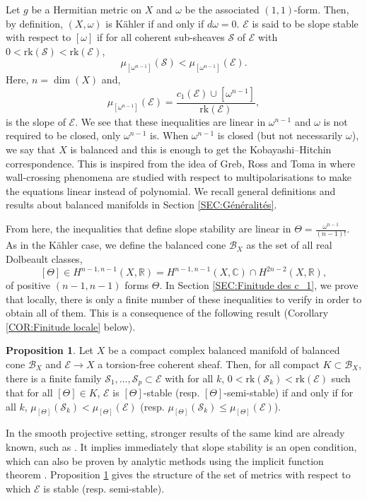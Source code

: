 \documentclass{article}
\theoremstyle{remark}
\theoremstyle{definition}
\newtheorem{propositionIntro}[theoremIntro]{Proposition}
\newcommand{\R}{\mathbb{R}}
\newcommand{\C}{\mathbb{C}}
\newcommand{\rk}{\mathrm{rk}}
\newcommand{\E}{\mathcal{E}}
\renewcommand{\leq}{\leqslant}
\begin{document}
Let $g$ be a Hermitian metric on $X$ and $\omega$ be the associated $(1,1)$-form. Then, by definition, $(X,\omega)$ is Kähler if and only if $d\omega = 0$. $\E$ is said to be slope stable with respect to $[\omega]$ if for all coherent sub-sheaves $\mathcal{S}$ of $\E$ with $0 < \rk(\mathcal{S}) < \rk(\E)$,
$$
\mu_{[\omega^{n - 1}]}(\mathcal{S}) < \mu_{[\omega^{n - 1}]}(\E).
$$
Here, $n = \dim(X)$ and,
$$
\mu_{[\omega^{n - 1}]}(\E) = \frac{c_1(\E) \cup [\omega^{n - 1}]}{\rk(\E)},
$$
is the slope of $\E$. We see that these inequalities are linear in $\omega^{n - 1}$ and $\omega$ is not required to be closed, only $\omega^{n - 1}$ is. When $\omega^{n - 1}$ is closed (but not necessarily $\omega$), we say that $X$ is balanced and this is enough to get the Kobayashi--Hitchin correspondence. This is inspired from the idea of Greb, Ross and Toma in \cite{GRT} where wall-crossing phenomena are studied with respect to multipolarisations to make the equations linear instead of polynomial. We recall general definitions and results about balanced manifolds in Section \ref{SEC:Généralités}.

From here, the inequalities that define slope stability are linear in $\Theta = \frac{\omega^{n - 1}}{(n - 1)!}$. As in the Kähler case, we define the balanced cone $\mathcal{B}_X$ as the set of all real Dolbeault classes,
$$
[\Theta] \in H^{n - 1,n - 1}(X,\R) = H^{n - 1,n - 1}(X,\C) \cap H^{2n - 2}(X,\R),
$$
of positive $(n - 1,n - 1)$ forms $\Theta$. In Section \ref{SEC:Finitude des c_1}, we prove that locally, there is only a finite number of these inequalities to verify in order to obtain all of them. This is a consequence of the following result (Corollary \ref{COR:Finitude locale} below).

\begin{propositionIntro}\label{PRO:1}
    Let $X$ be a compact complex balanced manifold of balanced cone $\mathcal{B}_X$ and $\E \rightarrow X$ a torsion-free coherent sheaf. Then, for all compact $K \subset \mathcal{B}_X$, there is a finite family $\mathcal{S}_1,\ldots,\mathcal{S}_p \subset \E$ with for all $k$, $0 < \rk(\mathcal{S}_k) < \rk(\E)$ such that for all $[\Theta] \in K$, $\E$ is $[\Theta]$-stable (resp. $[\Theta]$-semi-stable) if and only if for all $k$, $\mu_{[\Theta]}(\mathcal{S}_k) < \mu_{[\Theta]}(\E)$ (resp. $\mu_{[\Theta]}(\mathcal{S}_k) \leq \mu_{[\Theta]}(\E)$).
\end{propositionIntro}

In the smooth projective setting, stronger results of the same kind are already known, such as \cite[Theorem 6.7]{Greb_Toma}. It implies immediately that slope stability is an open condition, which can also be proven by analytic methods using the implicit function theorem \cite[Theorem 5.1.4]{Lübke_Teleman_KH}. Proposition \ref{PRO:1} gives the structure of the set of metrics with respect to which $\E$ is stable (resp. semi-stable).
\end{document}
